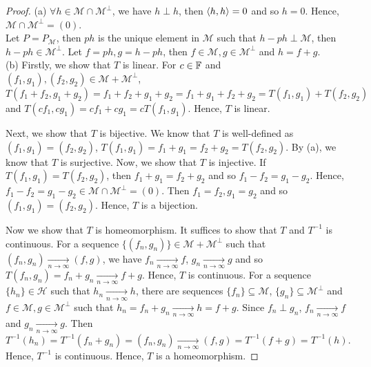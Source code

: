 \begin{proof}
    (a) $\forall h\in \mathscr{M}\cap \mathscr{M}^{\perp}$, we have $h\perp h$, then $\langle h,h\rangle=0$ and so $h=0$.
    Hence, $\mathscr{M}\cap \mathscr{M}^{\perp}=(0)$.\\
    Let $P=P_{\mathscr{M}}$, then $ph$ is the unique element in $\mathscr{M}$ such that $h-ph\perp \mathscr{M}$, then $h-ph\in \mathscr{M}^{\perp}$.
    Let $f=ph,g=h-ph$, then $f\in \mathscr{M},g\in\mathscr{M}^{\perp}$ and $h=f+g$.
    \\
    (b) 
    Firstly, we show that $T$ is linear. For $c\in\mathbb{F}$ and $(f_1,g_1),(f_2,g_2)\in \mathscr{M}+\mathscr{M}^{\perp}$,
    $T(f_1+f_2,g_1+g_2)=f_1+f_2+g_1+g_2=f_1+g_1+f_2+g_2=T(f_1,g_1)+T(f_2,g_2)$ and $T(cf_1,cg_1)=cf_1+cg_1=cT(f_1,g_1)$.
    Hence, $T$ is linear.
    \par
    Next, we show that $T$ is bijective.
    We know that $T$ is well-defined as $(f_1,g_1)=(f_2,g_2)$, $T(f_1,g_1)=f_1+g_1=f_2+g_2=T(f_2,g_2)$.
    By (a), we know that $T$ is surjective. Now, we show that $T$ is injective.  
    If $T(f_1,g_1)=T(f_2,g_2)$, then $f_1+g_1=f_2+g_2$ and so $f_1-f_2=g_1-g_2$.
    Hence, $f_1-f_2=g_1-g_2\in \mathscr{M}\cap \mathscr{M}^{\perp}=(0)$. 
    Then $f_1=f_2,g_1=g_2$ and so $(f_1,g_1)=(f_2,g_2)$. 
    Hence, $T$ is a bijection.
    \par
    Now we show that $T$ is homeomorphism. It suffices to show that $T$ and $T^{-1}$ is continuous.
    For a sequence $\{(f_n,g_n)\}\in \mathscr{M}+\mathscr{M}^{\perp}$ such that $(f_n,g_n)\underset{n\rightarrow \infty}{\longrightarrow} (f,g)$, 
    we have $f_n\underset{n\rightarrow \infty}{\longrightarrow} f$, $g_n\underset{n\rightarrow \infty}{\longrightarrow}g$ and so $T(f_n,g_n)=f_n+g_n\underset{n\rightarrow \infty}{\longrightarrow} f+g$. Hence, $T$ is continuous.
    For a sequence $\{h_n\}\in \mathscr{H}$ such that $h_n\underset{n\rightarrow \infty}{\longrightarrow} h$, 
    there are sequences $\{f_n\}\subseteq \mathscr{M}$, $\{g_n\}\subseteq \mathscr{M}^{\perp}$ and $f\in\mathscr{M},g\in\mathscr{M}^{\perp}$ 
    such that $h_n=f_n+g_n\underset{n\rightarrow \infty}{\longrightarrow} h=f+g$. 
    Since $f_n\perp g_n$, $f_n\underset{n\rightarrow \infty}{\longrightarrow} f$ and $g_n\underset{n\rightarrow \infty}{\longrightarrow} g$.
    Then $T^{-1}(h_n)=T^{-1}(f_n+g_n)=(f_n,g_n)\underset{n\rightarrow \infty}{\longrightarrow} (f,g)=T^{-1}(f+g)=T^{-1}(h)$.
    Hence, $T^{-1}$ is continuous.
    Hence, $T$ is a homeomorphism.
\end{proof}


